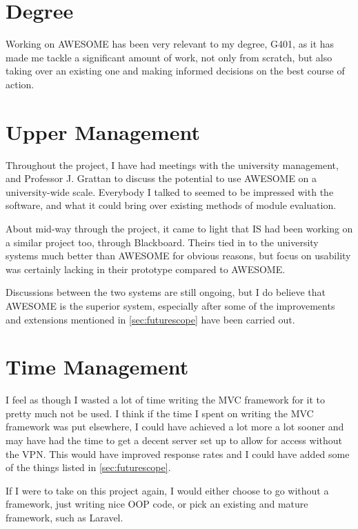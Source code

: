 	\section{Degree}
	
	Working on \ac{AWESOME} has been very relevant to my degree, G401, as it has made me tackle a significant amount of work, not only from scratch, but also taking over an existing one and making informed decisions on the best course of action.
	
	\section{Upper Management}
	
	Throughout the project, I have had meetings with the university management, and Professor J. Grattan to discuss the potential to use \ac{AWESOME} on a university-wide scale.
	Everybody I talked to seemed to be impressed with the software, and what it could bring over existing methods of module evaluation.
	
	About mid-way through the project, it came to light that \ac{IS} had been working on a similar project too, through Blackboard.
	Theirs tied in to the university systems much better than \ac{AWESOME} for obvious reasons, but focus on usability was certainly lacking in their prototype compared to \ac{AWESOME}.
	
	Discussions between the two systems are still ongoing, but I do believe that \ac{AWESOME} is the superior system, especially after some of the improvements and extensions mentioned in \autoref{sec:futurescope} have been carried out.
	
	\section{Time Management}
	
	I feel as though I wasted a lot of time writing the \ac{MVC} framework for it to pretty much not be used. I think if the time I spent on writing the \ac{MVC} framework was put elsewhere, I could have achieved a lot more a lot sooner and may have had the time to get a decent server set up to allow for access without the \ac{VPN}.
	This would have improved response rates and I could have added some of the things listed in \autoref{sec:futurescope}.
	
	If I were to take on this project again, I would either choose to go without a framework, just writing nice \ac{OOP} code, or pick an existing and mature framework, such as Laravel.
	
